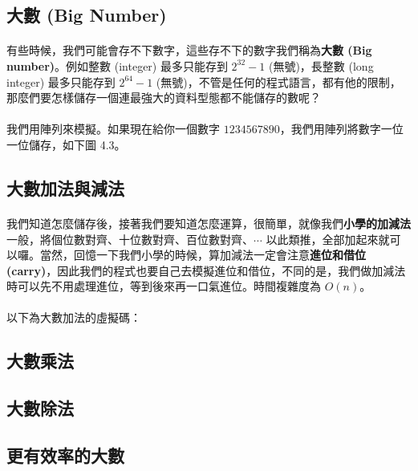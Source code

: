 \documentclass[12pt,a4paper,oneside]{report}
\begin{document}
\begin{CJK}{UTF8}{bkai}
\section{大數 (Big Number)}

\paragraph{}有些時候，我們可能會存不下數字，這些存不下的數字我們稱為\textbf{大數 (Big number)}。例如整數 (integer) 最多只能存到 $2^{32}-1$ (無號)，長整數 (long integer) 最多只能存到 $2^{64}-1$ (無號)，不管是任何的程式語言，都有他的限制，那麼們要怎樣儲存一個連最強大的資料型態都不能儲存的數呢？

\paragraph{}我們用陣列來模擬。如果現在給你一個數字 $1234567890$，我們用陣列將數字一位一位儲存，如下圖 4.3。

\subsection{大數加法與減法}
\paragraph{}我們知道怎麼儲存後，接著我們要知道怎麼運算，很簡單，就像我們\textbf{小學的加減法}一般，將個位數對齊、十位數對齊、百位數對齊、$\cdots$ 以此類推，全部加起來就可以囉。當然，回憶一下我們小學的時候，算加減法一定會注意\textbf{進位和借位 (carry)}，因此我們的程式也要自己去模擬進位和借位，不同的是，我們做加減法時可以先不用處理進位，等到後來再一口氣進位。時間複雜度為 $O(n)$。

\paragraph{}以下為大數加法的虛擬碼：

\subsection{大數乘法}
\subsection{大數除法}
\subsection{更有效率的大數}


\end{CJK}
\end{document}
